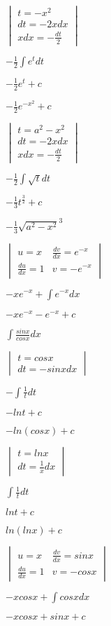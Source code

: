 \documentclass{article}
\begin{document}
$
\begin{vmatrix} t = -x^2\\  dt = -2xdx\\ xdx = -\frac{dt}{2} \end{vmatrix}
$

$
-\frac{1}{2} \int e^t dt
$

$
-\frac{1}{2}e^t + c
$

$
-\frac{1}{2}e^{-x^2} + c
$

$
\begin{vmatrix} t = a^2-x^2\\  dt = -2xdx\\ xdx = -\frac{dt}{2} \end{vmatrix}
$

$
-\frac{1}{2} \int \sqrt{t} dt
$

$
-\frac{1}{3} t^{\frac{3}{2}} + c
$

$
-\frac{1}{3} \sqrt{a^2 - x^2}^3
$

$
\begin{vmatrix} u = x   &  \frac{dv}{dx} = e^{-x} \\ \frac{du}{dx} = 1   &  v = -e^{-x}\end{vmatrix}
$

$
-xe^{-x} + \int e^{-x}dx
$

$
-xe^{-x} - e^{-x} + c
$

$
\int \frac{sinx}{cosx}dx
$

$
\begin{vmatrix} t = cosx \\ dt = -sinxdx \end{vmatrix}
$

$
-\int \frac{1}{t}dt
$

$
-lnt + c
$

$
-ln(cosx) + c
$

$
\begin{vmatrix} t = lnx \\ dt = \frac{1}{x}dx  \end{vmatrix}
$

$
\int \frac{1}{t}dt
$

$
lnt + c
$

$
ln(lnx) + c
$

$
\begin{vmatrix} u = x   &  \frac{dv}{dx} = sinx \\ \frac{du}{dx} = 1  &   v = -cosx\end{vmatrix}
$

$
-xcosx + \int cosxdx
$

$
-xcosx + sinx + c
$
\end{document}
